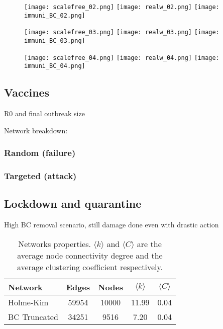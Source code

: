 \documentclass[DIV=12, BCOR=0pt]{scrartcl}  %
\begin{document}
   \begin{figure}[h!]
   	\centering
   	\texttt{[image: scalefree\_02.png]}
   	\texttt{[image: realw\_02.png]}
   	\texttt{[image: immuni\_BC\_02.png]}
   	
   	\texttt{[image: scalefree\_03.png]}
   	\texttt{[image: realw\_03.png]}
   	\texttt{[image: immuni\_BC\_03.png]}
   	
   	\texttt{[image: scalefree\_04.png]}
   	\texttt{[image: realw\_04.png]}
   	\texttt{[image: immuni\_BC\_04.png]}
   	
   	\caption{ }
   	\label{fig:outcomes1}
   \end{figure}
   
  
  \subsection{Vaccines}
  R0 and final outbreak size
  
  Network breakdown:
  \subsubsection{Random (failure)}
	\subsubsection{Targeted (attack)}

	\subsection{Lockdown and quarantine}
	High BC removal scenario, still damage done even with drastic action
	
	\begin{table}[h!]
		\centering
		\caption{Networks properties. $\langle k \rangle$ and $\langle C \rangle$ are the average node connectivity degree and the average clustering coefficient respectively. }
		\label{tab:lock_networks}
		\begin{tabular}{lcccc}
			\toprule
			Network &  Edges &  Nodes & $\langle k \rangle$ & $\langle C \rangle$ \\
			\midrule
			Holme-Kim 		&  59954 &  10000 & 11.99 &  0.04 \\
			BC Truncated 	&  34251 &   9516 &  7.20 &  0.04 \\
			
			\bottomrule
		\end{tabular}
	\end{table}
\end{document}
